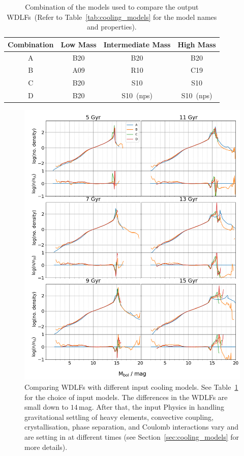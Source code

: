 \documentclass[fleqn,usenatbib]{rasti}
\begin{document}
\begin{table}
    \centering
    \begin{tabular}{cccc}
        Combination & Low Mass & Intermediate Mass & High Mass \\ \hline\hline
        A           & B20      & B20               & B20 \\
        B           & A09      & R10               & C19 \\
        C           & B20      & S10               & S10 \\
        D           & B20      & S10~(nps)         & S10~(nps) \\
    \end{tabular}
    \caption{Combination of the models used to compare the output WDLFs~(Refer
    to Table~\ref{tab:cooling_models} for the model names and properties).}
    \label{tab:cooling_model_combination}
\end{table}

\begin{figure}
    \centering
    \includegraphics[width=\textwidth]{fig_11_wdlf_compare_da_cooling_models.png}
    \caption{Comparing WDLFs with different input cooling models. See
    Table~\ref{tab:cooling_model_combination} for the choice of input models.
    The differences in the WDLFs are small down to $14$\,mag. After that, the
    input Physics in handling gravitational settling of heavy elements,
    convective coupling, crystallisation, phase separation, and Coulomb
    interactions vary and are setting in at different times (see
    Section~\ref{sec:cooling_models} for more details).
    }
    \label{fig:wdlf_compare_da_cooling_models}
\end{figure}
\end{document}

